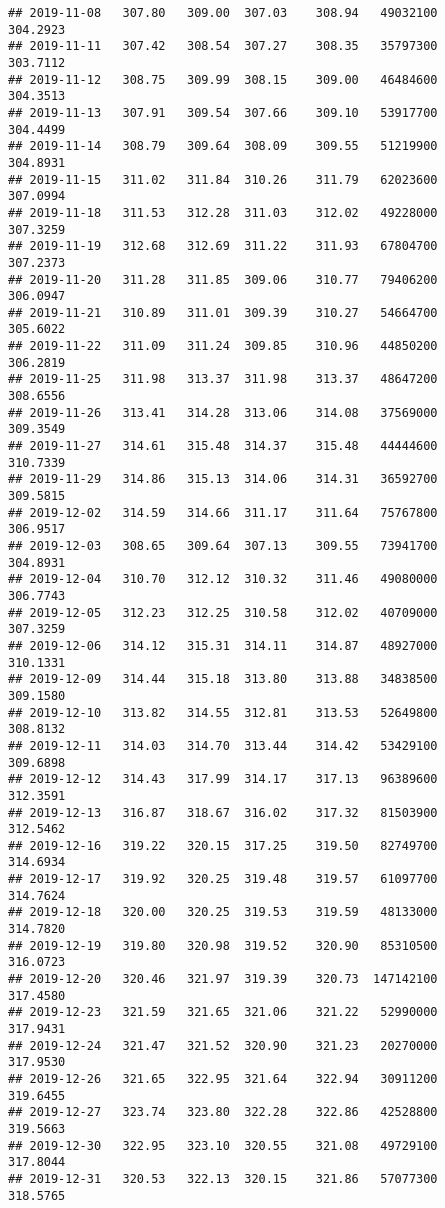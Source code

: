 \documentclass[
]{article}
\begin{document}
\begin{verbatim}
## 2019-11-08   307.80   309.00  307.03    308.94   49032100     304.2923
## 2019-11-11   307.42   308.54  307.27    308.35   35797300     303.7112
## 2019-11-12   308.75   309.99  308.15    309.00   46484600     304.3513
## 2019-11-13   307.91   309.54  307.66    309.10   53917700     304.4499
## 2019-11-14   308.79   309.64  308.09    309.55   51219900     304.8931
## 2019-11-15   311.02   311.84  310.26    311.79   62023600     307.0994
## 2019-11-18   311.53   312.28  311.03    312.02   49228000     307.3259
## 2019-11-19   312.68   312.69  311.22    311.93   67804700     307.2373
## 2019-11-20   311.28   311.85  309.06    310.77   79406200     306.0947
## 2019-11-21   310.89   311.01  309.39    310.27   54664700     305.6022
## 2019-11-22   311.09   311.24  309.85    310.96   44850200     306.2819
## 2019-11-25   311.98   313.37  311.98    313.37   48647200     308.6556
## 2019-11-26   313.41   314.28  313.06    314.08   37569000     309.3549
## 2019-11-27   314.61   315.48  314.37    315.48   44444600     310.7339
## 2019-11-29   314.86   315.13  314.06    314.31   36592700     309.5815
## 2019-12-02   314.59   314.66  311.17    311.64   75767800     306.9517
## 2019-12-03   308.65   309.64  307.13    309.55   73941700     304.8931
## 2019-12-04   310.70   312.12  310.32    311.46   49080000     306.7743
## 2019-12-05   312.23   312.25  310.58    312.02   40709000     307.3259
## 2019-12-06   314.12   315.31  314.11    314.87   48927000     310.1331
## 2019-12-09   314.44   315.18  313.80    313.88   34838500     309.1580
## 2019-12-10   313.82   314.55  312.81    313.53   52649800     308.8132
## 2019-12-11   314.03   314.70  313.44    314.42   53429100     309.6898
## 2019-12-12   314.43   317.99  314.17    317.13   96389600     312.3591
## 2019-12-13   316.87   318.67  316.02    317.32   81503900     312.5462
## 2019-12-16   319.22   320.15  317.25    319.50   82749700     314.6934
## 2019-12-17   319.92   320.25  319.48    319.57   61097700     314.7624
## 2019-12-18   320.00   320.25  319.53    319.59   48133000     314.7820
## 2019-12-19   319.80   320.98  319.52    320.90   85310500     316.0723
## 2019-12-20   320.46   321.97  319.39    320.73  147142100     317.4580
## 2019-12-23   321.59   321.65  321.06    321.22   52990000     317.9431
## 2019-12-24   321.47   321.52  320.90    321.23   20270000     317.9530
## 2019-12-26   321.65   322.95  321.64    322.94   30911200     319.6455
## 2019-12-27   323.74   323.80  322.28    322.86   42528800     319.5663
## 2019-12-30   322.95   323.10  320.55    321.08   49729100     317.8044
## 2019-12-31   320.53   322.13  320.15    321.86   57077300     318.5765

\end{verbatim}
\end{document}
